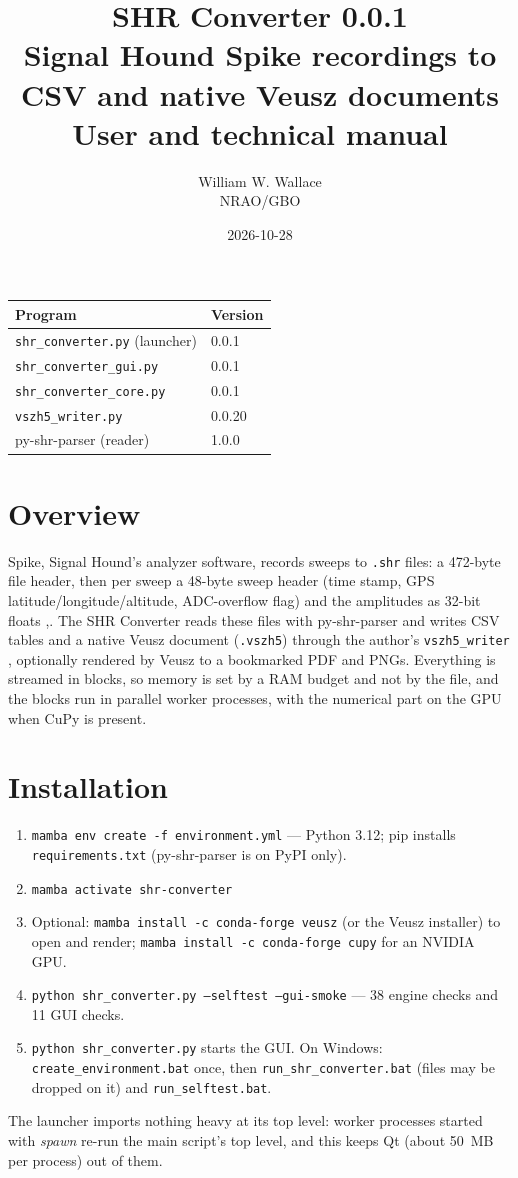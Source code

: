 \documentclass[11pt,a4paper]{article}
\title{SHR Converter 0.0.1\\[4pt]\large Signal Hound Spike \code{.shr} recordings to CSV and native Veusz documents\\
User and technical manual}
\author{William W. Wallace\\NRAO/GBO\\\code{wwallace@nrao.edu}}
\date{2026-10-28}
\newcommand{\code}[1]{\texttt{#1}}
\begin{document}
\maketitle
\begin{center}
\begin{tabular}{ll}
\toprule
Program & Version\\
\midrule
\code{shr\_converter.py} (launcher) & 0.0.1\\
\code{shr\_converter\_gui.py} & 0.0.1\\
\code{shr\_converter\_core.py} & 0.0.1\\
\code{vszh5\_writer.py} & 0.0.20\\
py-shr-parser (reader) & 1.0.0\\
\bottomrule
\end{tabular}
\end{center}
\tableofcontents
\clearpage

\section{Overview}
Spike, Signal Hound's analyzer software, records sweeps to \code{.shr} files: a 472-byte file header, then
per sweep a 48-byte sweep header (time stamp, GPS latitude/longitude/altitude, ADC-overflow flag) and the
amplitudes as 32-bit floats \cite{r1},\cite{r2}. The SHR Converter reads these files with py-shr-parser
\cite{r1} and writes CSV tables and a native Veusz document (\code{.vszh5}) through the author's
\code{vszh5\_writer} \cite{r13}, optionally rendered by Veusz \cite{r10} to a bookmarked PDF and PNGs.
Everything is streamed in blocks, so memory is set by a RAM budget and not by the file, and the blocks run in
parallel worker processes, with the numerical part on the GPU when CuPy is present.

\section{Installation}
\begin{enumerate}[nosep]
\item \code{mamba env create -f environment.yml} --- Python 3.12; pip installs \code{requirements.txt}
      (py-shr-parser is on PyPI only).
\item \code{mamba activate shr-converter}
\item Optional: \code{mamba install -c conda-forge veusz} (or the Veusz installer) to open and render;
      \code{mamba install -c conda-forge cupy} for an NVIDIA GPU.
\item \code{python shr\_converter.py --selftest --gui-smoke} --- 38 engine checks and 11 GUI checks.
\item \code{python shr\_converter.py} starts the GUI. On Windows: \code{create\_environment.bat} once,
      then \code{run\_shr\_converter.bat} (files may be dropped on it) and \code{run\_selftest.bat}.
\end{enumerate}
The launcher imports nothing heavy at its top level: worker processes started with \emph{spawn} re-run the
main script's top level, and this keeps Qt (about 50~MB per process) out of them.
\end{document}
